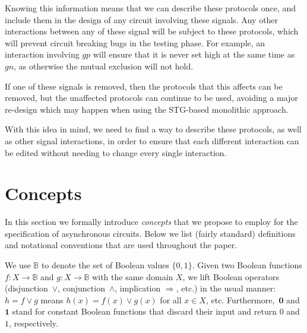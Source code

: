 \documentclass[british,compsoc]{IEEEtran}
\begin{document}
Knowing this information means that we can describe these protocols once, and
include them in the design of any circuit involving these signals. Any other
interactions between any of these signal will be subject to these protocols,
which will prevent circuit breaking bugs in the testing phase. For example, an
interaction involving $gp$ will ensure that it is never set high at
the same time as $gn$, as otherwise the mutual exclusion will not hold.

If one of these signals is removed, then the protocols that this affects can
be removed, but the unaffected protocols can continue to be used, avoiding a
major re-design which may happen when using the STG-based monolithic approach.

With this idea in mind, we need to find a way to describe these protocols, as
well as other signal interactions, in order to ensure that each different
interaction can be edited without needing to change every single interaction.

\vspace{-2mm}
\section{Concepts \label{sec:Concepts}}

In this section we formally introduce \emph{concepts} that we propose
to employ for the specification of asynchronous circuits. Below we
list (fairly standard) definitions and notational conventions that
are used throughout the paper.

We use $\mathbb{B}$ to denote the set of Boolean values $\{0,1\}$.
Given two Boolean functions $f:X\rightarrow\mathbb{B}$ and $g:X\rightarrow\mathbb{B}$
with the same domain $X$, we lift Boolean operators (disjunction~$\vee$,
conjunction~$\wedge$, implication $\Rightarrow$, etc.) in the usual
manner: $h=f\vee g$ means $h(x)=f(x)\vee g(x)$ for all $x\in X$,
etc. Furthermore,~$\mathbf{0}$ and~$\mathbf{1}$ stand for constant
Boolean functions that discard their input and return $0$
and $1$, respectively.
\end{document}
